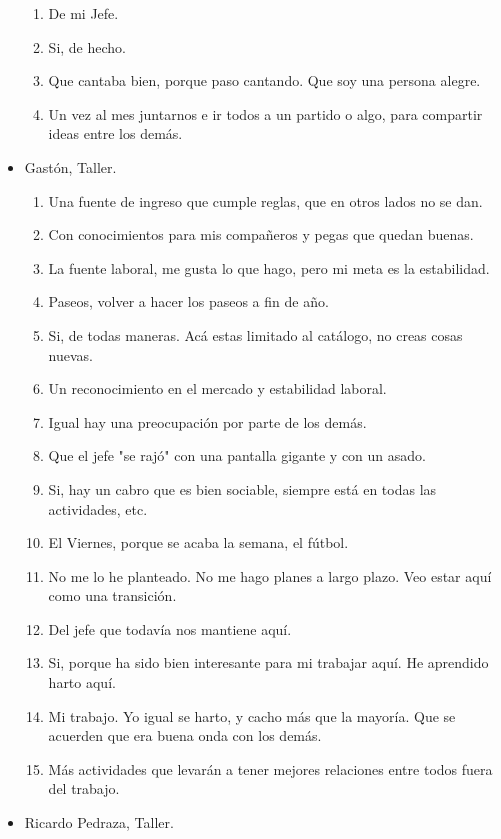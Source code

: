 \begin{itemize}
\begin{enumerate}
        \item De mi Jefe.
        \item Si, de hecho.
        \item Que cantaba bien, porque paso cantando. Que soy una persona
        alegre.
        \item Un vez al mes juntarnos e ir todos a un partido o algo, para
        compartir ideas entre los demás.
    \end{enumerate}
    \item Gastón, Taller.
    \begin{enumerate}
        \item Una fuente de ingreso que cumple reglas, que en otros lados no
        se dan.
        \item Con conocimientos para mis compañeros y pegas que quedan buenas.
        \item La fuente laboral, me gusta lo que hago, pero mi meta es la
        estabilidad.
        \item Paseos, volver a hacer los paseos a fin de año.
        \item Si, de todas maneras. Acá estas limitado al catálogo, no creas
        cosas nuevas.
        \item Un reconocimiento en el mercado y estabilidad laboral.
        \item Igual hay una preocupación por parte de los demás.
        \item Que el jefe "se rajó" con una pantalla gigante y con un asado.
        \item Si, hay un cabro que es bien sociable, siempre está en todas las
        actividades, etc.
        \item El Viernes, porque se acaba la semana, el fútbol.
        \item No me lo he planteado. No me hago planes a largo plazo. Veo
        estar aquí como una transición.
        \item Del jefe que todavía nos mantiene aquí.
        \item Si, porque ha sido bien interesante para mi trabajar aquí. He
        aprendido harto aquí.
        \item Mi trabajo. Yo igual se harto, y cacho más que la mayoría. Que se
        acuerden que era buena onda con los demás.
        \item Más actividades que levarán a tener mejores relaciones entre
        todos fuera del trabajo.
    \end{enumerate}
    \item Ricardo Pedraza, Taller.

\end{itemize}
